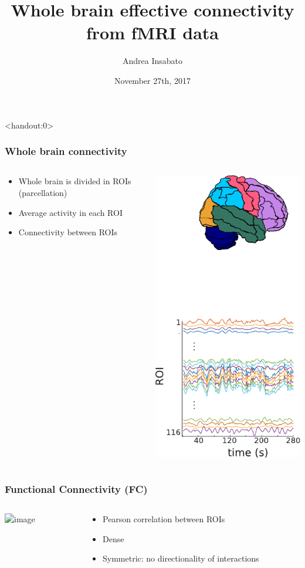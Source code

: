 \documentclass[final]{beamer}
\title[Effective connectivity]{\textbf{Whole brain effective connectivity from fMRI data}}
\author{Andrea Insabato}
\date{November 27th, 2017}
\begin{document}
\begin{frame}<handout:0>
  \titlepage
\end{frame}

\begin{frame}
\transdissolve
\frametitle{Whole brain connectivity}
\begin{columns}
\begin{column}{0.5\textwidth}
	\begin{itemize}
		\item Whole brain is divided in ROIs (parcellation)
		\item Average activity in each ROI
		\item Connectivity between ROIs
	\end{itemize}
\end{column}
\begin{column}{0.5\textwidth}
\includegraphics[width=0.5\columnwidth]{parcellation}
\end{column}
\end{columns}
\end{frame}

\begin{frame}
\transdissolve
\frametitle{Functional Connectivity (FC)}
\begin{columns}
\begin{column}{0.5\textwidth}
\includegraphics<1->[width=0.7\columnwidth]{FC}
\end{column}
\begin{column}{0.5\textwidth}
	\begin{itemize}
			\pause
		\item Pearson correlation between ROIs
			\pause
		\item Dense 
			\pause
		\item Symmetric: no directionality of interactions 
	\end{itemize}
\end{column}
\end{columns}
\end{frame}
\end{document}
